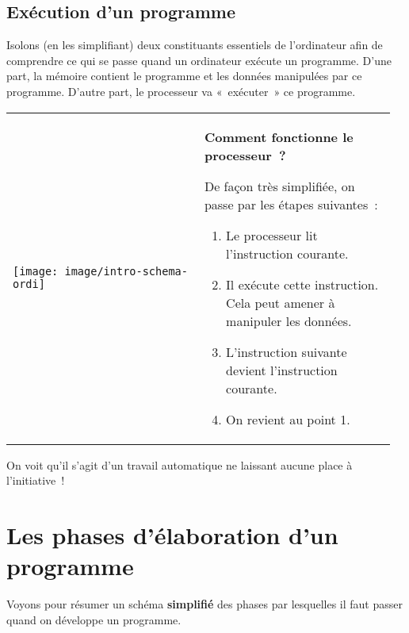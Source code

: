 	\subsection{Exécution d’un programme}

		Isolons (en les simplifiant) deux constituants essentiels de
		l’ordinateur afin de comprendre ce qui se passe quand
		un ordinateur exécute un programme. D’une part, la
		mémoire contient le programme et les données manipulées par ce
		programme. D’autre part, le processeur va «~exécuter~»
		ce programme.

		\begin{tabular}{m{0.48\linewidth}m{0.48\linewidth}}
			\begin{center}
			\texttt{[image: image/intro-schema-ordi]}
			\end{center}
		&
			\textbf{Comment fonctionne le processeur~?}
	
			De façon très simplifiée, on passe par les étapes suivantes~:
	
			\medskip
			\begin{flushleft}
			\begin{enumerate}
			\item Le processeur lit l’instruction courante.
			\item Il exécute cette instruction. Cela peut amener à manipuler les données.
			\item L’instruction suivante devient l’instruction courante.
			\item On revient au point 1.
			\end{enumerate}
			\end{flushleft}
		\\
		\end{tabular}

		On voit qu’il s’agit d’un travail
		automatique ne laissant aucune place à l’initiative~!

\section{Les phases d’élaboration d’un programme}

	Voyons pour résumer un schéma \textbf{simplifié} des phases par
	lesquelles il faut passer quand on développe un programme.

